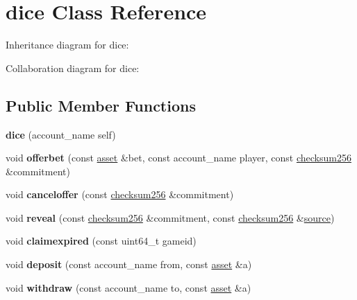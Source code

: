 \hypertarget{classdice}{}\section{dice Class Reference}
\label{classdice}


Inheritance diagram for dice\+:


Collaboration diagram for dice\+:
\subsection*{Public Member Functions}
\begin{DoxyCompactItemize}
\item 
\mbox{\label{classdice_a623f1f179889abb7278c799f8c4cc683}} 
{\bfseries dice} (account\+\_\+name self)
\item 
\mbox{\label{classdice_a736be4404e75ca6c832aa8b78c9c1b80}} 
void {\bfseries offerbet} (const \mbox{\hyperlink{structaacio_1_1asset}{asset}} \&bet, const account\+\_\+name player, const \mbox{\hyperlink{structchecksum256}{checksum256}} \&commitment)
\item 
\mbox{\label{classdice_a9af24c27b8b12806a9acf01d0c6fbe4d}} 
void {\bfseries canceloffer} (const \mbox{\hyperlink{structchecksum256}{checksum256}} \&commitment)
\item 
\mbox{\label{classdice_a9809109c1d49e157d4a507e63a290ff9}} 
void {\bfseries reveal} (const \mbox{\hyperlink{structchecksum256}{checksum256}} \&commitment, const \mbox{\hyperlink{structchecksum256}{checksum256}} \&\mbox{\hyperlink{structsource}{source}})
\item 
\mbox{\label{classdice_a8b5a03abeb022088685abf8d43fce073}} 
void {\bfseries claimexpired} (const uint64\+\_\+t gameid)
\item 
\mbox{\label{classdice_a04668aef3b4ec90f2f5810e67408c67b}} 
void {\bfseries deposit} (const account\+\_\+name from, const \mbox{\hyperlink{structaacio_1_1asset}{asset}} \&a)
\item 
\mbox{\label{classdice_a8f0860af7ba0c43ca3bdf979b36baab7}} 
void {\bfseries withdraw} (const account\+\_\+name to, const \mbox{\hyperlink{structaacio_1_1asset}{asset}} \&a)
\end{DoxyCompactItemize}
